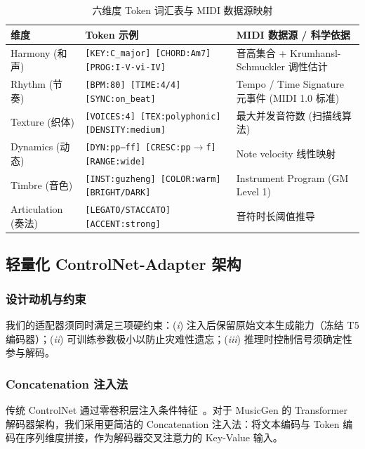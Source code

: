 \documentclass[UTF8,12pt,a4paper]{ctexart}
\begin{document}
\begin{table}[t]
\centering
\small
\caption{六维度 Token 词汇表与 MIDI 数据源映射}
\label{tab:token_vocab}
\begin{tabularx}{\textwidth}{@{}l >{\raggedright\arraybackslash}X >{\raggedright\arraybackslash}X@{}}
\toprule
\textbf{维度} & \textbf{Token 示例} & \textbf{MIDI 数据源 / 科学依据} \\
\midrule
Harmony (和声) & \texttt{[KEY:C\_major] [CHORD:Am7] [PROG:I-V-vi-IV]} & 音高集合 + Krumhansl-Schmuckler 调性估计~\cite{krumhansl} \\
Rhythm (节奏) & \texttt{[BPM:80] [TIME:4/4] [SYNC:on\_beat]} & Tempo / Time Signature 元事件 (MIDI 1.0 标准) \\
Texture (织体) & \texttt{[VOICES:4] [TEX:polyphonic] [DENSITY:medium]} & 最大并发音符数 (扫描线算法) \\
Dynamics (动态) & \texttt{[DYN:pp--ff] [CRESC:pp$\to$f] [RANGE:wide]} & Note velocity 线性映射~\cite{maestro} \\
Timbre (音色) & \texttt{[INST:guzheng] [COLOR:warm] [BRIGHT/DARK]} & Instrument Program (GM Level 1) \\
Articulation (奏法) & \texttt{[LEGATO/STACCATO] [ACCENT:strong]} & 音符时长阈值推导~\cite{groove} \\
\bottomrule
\end{tabularx}
\end{table}

\subsection{轻量化 ControlNet-Adapter 架构}

\subsubsection{设计动机与约束}

我们的适配器须同时满足三项硬约束：(\textit{i}) 注入后保留原始文本生成能力（冻结 T5 编码器）；(\textit{ii}) 可训练参数极小以防止灾难性遗忘；(\textit{iii}) 推理时控制信号须确定性参与解码。

\subsubsection{Concatenation 注入法}

传统 ControlNet 通过零卷积层注入条件特征~\cite{controlnet}。对于 MusicGen 的 Transformer 解码器架构，我们采用更简洁的 Concatenation 注入法：将文本编码与 Token 编码在序列维度拼接，作为解码器交叉注意力的 Key-Value 输入。
\end{document}
